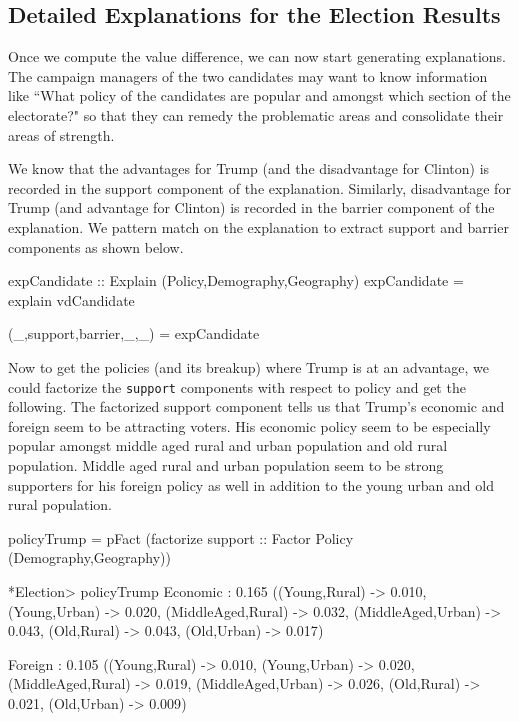 \documentclass{jfp}
\newcommand{\prog}[1]{\texttt{#1}}
\begin{document}
\subsection{Detailed Explanations for the Election Results}
Once we compute the value difference, we can now start generating explanations. The campaign managers of the two candidates may want to know information like ``What policy of the candidates are popular and amongst which section of the electorate?" so that they can remedy the problematic areas and consolidate their areas  of strength. 

We know that the advantages for Trump (and the disadvantage for Clinton) is recorded in the support component of the explanation. Similarly, disadvantage for Trump (and advantage for Clinton) is recorded in the barrier component of the explanation. We pattern match on the explanation to extract support and barrier components as shown below.
\begin{haskellcode}
expCandidate :: Explain (Policy,Demography,Geography)
expCandidate = explain vdCandidate

(_,support,barrier,_,_) = expCandidate
\end{haskellcode}
Now to get the policies (and its breakup) where Trump is at an advantage, we could factorize the \prog{support} components with respect to policy and get the following. The factorized support component tells us that Trump's economic and foreign seem to be attracting voters. His economic policy seem to be especially popular amongst middle aged rural and urban population and old rural population. Middle aged rural and urban population seem to be strong supporters for his foreign policy as well in addition to the young urban and old rural population. 
\begin{haskellcode}
policyTrump = pFact (factorize support :: Factor Policy (Demography,Geography))

*Election> policyTrump
Economic : 0.165 ({(Young,Rural) -> 0.010,
                   (Young,Urban) -> 0.020,
                   (MiddleAged,Rural) -> 0.032,
                   (MiddleAged,Urban) -> 0.043,
                   (Old,Rural) -> 0.043,
                   (Old,Urban) -> 0.017})

Foreign : 0.105 ({(Young,Rural) -> 0.010,
                  (Young,Urban) -> 0.020,
                  (MiddleAged,Rural) -> 0.019,
                  (MiddleAged,Urban) -> 0.026,
                  (Old,Rural) -> 0.021,
                  (Old,Urban) -> 0.009})
\end{haskellcode}
\end{document}
